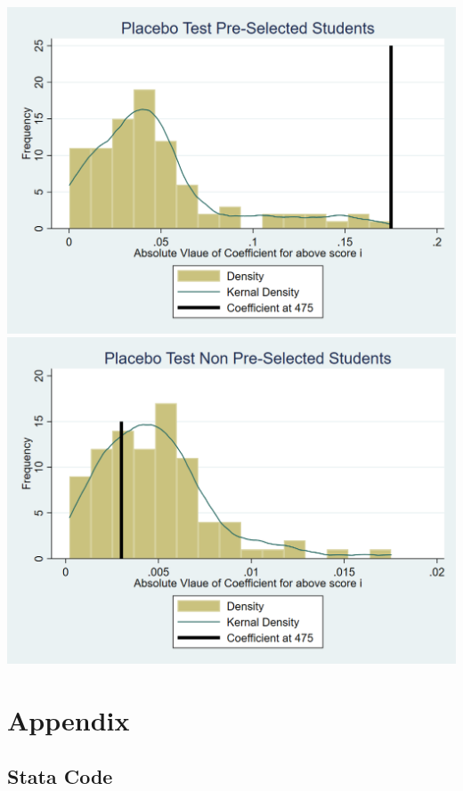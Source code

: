 \documentclass[11pt]{article}
\begin{document}
 	\includegraphics[width=1\linewidth]{placebo_1.png}
\includegraphics[width=1\linewidth]{placebo_2.png}



\section{Appendix}
\subsection{Stata Code}






\end{document}
